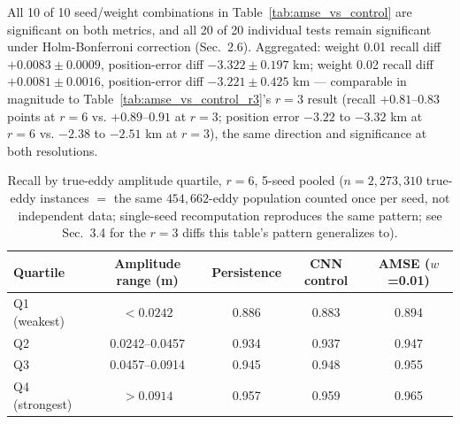 \documentclass[11pt]{article}
\begin{document}
All 10 of 10 seed/weight combinations in Table~\ref{tab:amse_vs_control} are significant on both metrics, and all 20 of 20 individual tests remain significant under Holm-Bonferroni correction (Sec.~2.6). Aggregated: weight 0.01 recall diff $+0.0083 \pm 0.0009$, position-error diff $-3.322 \pm 0.197$ km; weight 0.02 recall diff $+0.0081 \pm 0.0016$, position-error diff $-3.221 \pm 0.425$ km --- comparable in magnitude to Table~\ref{tab:amse_vs_control_r3}'s $r=3$ result (recall $+0.81$--$0.83$ points at $r=6$ vs. $+0.89$--$0.91$ at $r=3$; position error $-3.22$ to $-3.32$ km at $r=6$ vs. $-2.38$ to $-2.51$ km at $r=3$), the same direction and significance at both resolutions.

\begin{table}[h]
\centering
\caption{Recall by true-eddy amplitude quartile, $r=6$, 5-seed pooled ($n=2{,}273{,}310$ true-eddy instances $=$ the same $454{,}662$-eddy population counted once per seed, not independent data; single-seed recomputation reproduces the same pattern; see Sec.~3.4 for the $r=3$ diffs this table's pattern generalizes to).}
\label{tab:amplitude_quartile}
\begin{tabular}{lcccc}
\toprule
Quartile & Amplitude range (m) & Persistence & CNN control & AMSE ($w$=0.01) \\
\midrule
Q1 (weakest) & $<0.0242$ & 0.886 & 0.883 & 0.894 \\
Q2 & 0.0242--0.0457 & 0.934 & 0.937 & 0.947 \\
Q3 & 0.0457--0.0914 & 0.945 & 0.948 & 0.955 \\
Q4 (strongest) & $>0.0914$ & 0.957 & 0.959 & 0.965 \\
\bottomrule
\end{tabular}
\end{table}
\end{document}
